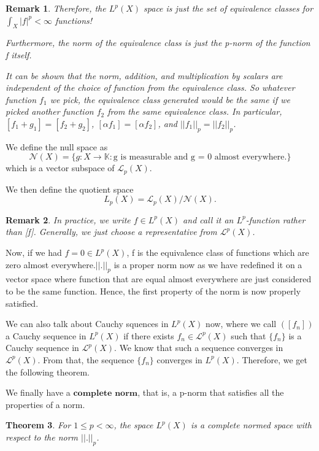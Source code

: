 \documentclass[twoside]{article}
\newcounter{lecnum}
\newtheorem{theorem}{Theorem}[lecnum]
\newtheorem{remark}[theorem]{Remark}
\begin{document}
\begin{remark}
Therefore, the $L^p(X)$ space is just the set of equivalence classes for $\int_X|f|^p < \infty$ functions!

Furthermore, the norm of the equivalence class is just the p-norm of the function f itself.

It can be shown that the norm, addition, and multiplication by scalars are independent of the choice of function from the equivalence class. So whatever function $f_1$ we pick, the equivalence class generated would be the same if we picked another function $f_2$ from the same equivalence class. In particular, $[f_1 + g_1] = [f_2 + g_2]$, $[\alpha f_1] = [\alpha f_2]$, and $||f_1||_p = ||f_2||_p$. 
\end{remark}

We define the null space as
$$
\mathcal{N}(X) = \{g: X \rightarrow \mathbb{K}: \text{g is measurable and g = 0 almost everywhere.}\}
$$
which is a vector subspace of $\mathcal{L}_p(X)$.

We then define the quotient space 
$$
L_p(X) = \mathcal{L}_p(X)/\mathcal{N}(X).
$$

\begin{remark}In practice, we write $f \in L^p(X)$ and call it an $L^p$-function rather than [f]. Generally, we just choose a representative from $\mathcal{L}^p(X)$.
\end{remark}


Now, if we had $f = 0 \in L^p(X)$, f is the equivalence class of functions which are zero almost everywhere.$||.||_p$ is a proper norm now as we have redefined it on a vector space where function that are equal almost everywhere are just considered to be the same function. Hence, the first property of the norm is now properly satisfied.

We can also talk about Cauchy squences in $L^p(X)$ now, where we call $([f_n])$ a Cauchy sequence in $L^p(X)$ if there exists $f_n \in \mathcal{L}^p(X)$ such that $\{f_n\}$ is a Cauchy sequence in $\mathcal{L}^p(X)$. We know that such a sequence converges in $\mathcal{L}^p(X)$. From that, the sequence $\{f_n\}$ converges in $L^p(X)$. Therefore, we get the following theorem.

We finally have a $\textbf{complete norm}$, that is, a p-norm that satisfies all the properties of a norm.

\begin{theorem}For $1 \leq p < \infty$, the space $L^p(X)$ is a complete normed space with respect to the norm $||.||_p$.
\end{theorem}
\end{document}
